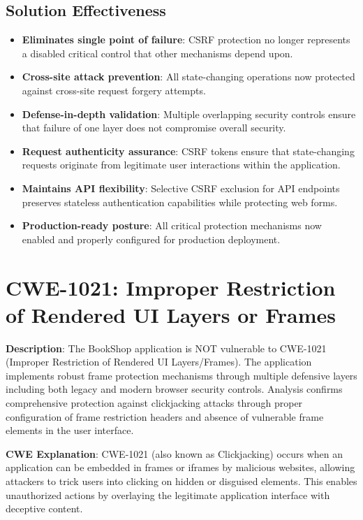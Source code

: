 \documentclass[]{UCD_CS_FYP_Report}
\begin{document}
\subsection*{Solution Effectiveness}
\begin{itemize}
	\item \textbf{Eliminates single point of failure}: CSRF protection no longer represents a disabled critical control that other mechanisms depend upon.
	\item \textbf{Cross-site attack prevention}: All state-changing operations now protected against cross-site request forgery attempts.
	\item \textbf{Defense-in-depth validation}: Multiple overlapping security controls ensure that failure of one layer does not compromise overall security.
	\item \textbf{Request authenticity assurance}: CSRF tokens ensure that state-changing requests originate from legitimate user interactions within the application.
	\item \textbf{Maintains API flexibility}: Selective CSRF exclusion for API endpoints preserves stateless authentication capabilities while protecting web forms.
	\item \textbf{Production-ready posture}: All critical protection mechanisms now enabled and properly configured for production deployment.
\end{itemize}


\section{CWE-1021: Improper Restriction of Rendered UI Layers or Frames}

\textbf{Description}: The BookShop application is NOT vulnerable to CWE-1021 (Improper Restriction of Rendered UI Layers/Frames). The application implements robust frame protection mechanisms through multiple defensive layers including both legacy and modern browser security controls. Analysis confirms comprehensive protection against clickjacking attacks through proper configuration of frame restriction headers and absence of vulnerable frame elements in the user interface.

\textbf{CWE Explanation}: CWE-1021 (also known as Clickjacking) occurs when an application can be embedded in frames or iframes by malicious websites, allowing attackers to trick users into clicking on hidden or disguised elements. This enables unauthorized actions by overlaying the legitimate application interface with deceptive content.
\end{document}
